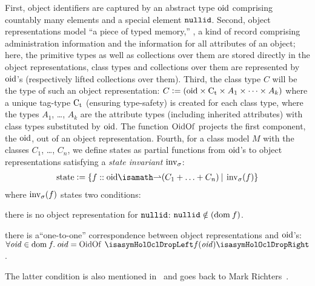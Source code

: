 First, object identifiers are captured by an abstract type $\mathrm{oid}$ comprising
countably many elements and a special element $\mathtt{nullid}$.
%
Second, object representations model ``a piece of typed memory,'' \ie, a kind of
record comprising administration information and the information for all
attributes of an object; here, the primitive types as well as collections over
them are stored directly in the object representations, class types and
collections over them are represented by $\mathrm{oid}$'s (respectively lifted
collections over them).
%
Third, the class type $C$ will be the type of such an object representation: $C
\mathrel{\mathop:}= (\mathrm{oid} \times \mathrm{C}_{\text{t}} \times A_1 \times \cdots \times A_k )$ where a
unique tag-type $\mathrm{C}_{\text{t}}$ (ensuring type-safety) is created for each class type,
where the types $A_1$, \ldots, $A_k$ are the attribute types (including
inherited attributes) with class types substituted by $\mathrm{oid}$. The function
$\HolOclOidOf$ projects the first component, the $\mathrm{oid}$, out of an object
representation.
%
Fourth,
for a  class model $M$ with the classes $C_1$, \ldots, $C_n$, we
define states as partial functions from $\mathrm{oid}$'s to object representations
satisfying a \emph{state invariant} $\operatorname{inv}_\sigma$:
\begin{gather*}
  \state{} \defeq \{ f :: \oid \isasymrightharpoonup (C_1 + \ldots +
  C_n) \ap|\ap \inv_\sigma(f) \}
\end{gather*}
where $\operatorname{inv}_\sigma(f)$ states two conditions:
\begin{inparaenum}[1)]
\item there is no object representation for $\mathtt{nullid}$: $\mathtt{nullid} \notin (\mathrm{dom}\: f)$.
\item there is a``one-to-one'' correspondence between object representations and
  $\mathrm{oid}$'s: $\forall \mathit{oid} \in \dom\ap f\spot oid = \HolOclOidOf\ap
  \drop{f(\mathit{oid})}$.
\end{inparaenum}
The latter condition is also mentioned in~\cite[Annex A]{omg:ocl:2003} and
goes back to Mark Richters~\cite{richters:precise:2002}.

